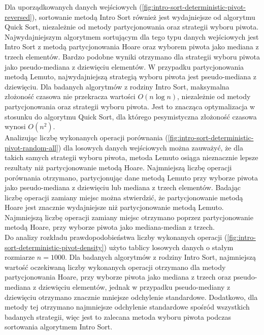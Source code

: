 Dla uporządkowanych danych wejściowych (\ref{fig:intro-sort-deterministic-pivot-reversed}), sortowanie metodą Intro Sort również jest wydajniejsze od algorytmu Quick Sort, niezależnie od metody partycjonowania oraz strategii wyboru piwota. Najwydajniejszym algorytmem sortującym dla tego typu danych wejściowych jest Intro Sort z metodą partycjonowania Hoare oraz wyborem piwota jako mediana z trzech elementów. Bardzo podobne wyniki otrzymano dla strategii wyboru piwota jako pseudo-mediana z dziewięciu elementów. W przypadku partycjonowania metodą Lemuto, najwydajniejszą strategią wyboru piwota jest pseudo-mediana z dziewięciu. Dla badanych algorytmów z rodziny Intro Sort, maksymalna złożoność czasowa nie przekracza wartości $O(n\log{n})$, niezależnie od metody partycjonowania oraz strategii wyboru piwota. Jest to znacząca optymalizacja w stosunku do algorytmu Quick Sort, dla którego pesymistyczna złożoność czasowa wynosi $O(n^2)$.\\

Analizując liczbę wykonanych operacji porównania (\ref{fig:intro-sort-deterministic-pivot-random-all}) dla losowych danych wejściowych można zauważyć, że dla takich samych strategii wyboru piwota, metoda Lemuto osiąga nieznacznie lepsze rezultaty niż partycjonowanie metodą Hoare. Najmniejszą liczbę operacji porównania otrzymano, partycjonując dane metodą Lemuto przy wyborze piwota jako pseudo-mediana z dziewięciu lub mediana z trzech elementów. Badając liczbę operacji zamiany miejsc można stwierdzić, że partycjonowanie metodą Hoare jest znacznie wydajniejsze niż partycjonowanie metodą Lemuto. Najmniejszą liczbę operacji zamiany miejsc otrzymano poprzez partycjonowanie metodą Hoare, przy wyborze piwota jako mediana-median z trzech.\\

Do analizy rozkładu prawdopodobieństwa liczby wykonanych operacji (\ref{fig:intro-sort-deterministic-pivot-density}) użyto tablicy losowych danych o stałym rozmiarze $n = 1000$. Dla badanych algorytmów z rodziny Intro Sort, najmniejszą wartość oczekiwaną liczby wykonanych operacji otrzymano dla metody partycjonowania Hoare, przy wyborze piwota jako mediana z trzech oraz pseudo-mediana z dziewięciu elementów, jednak w przypadku pseudo-mediany z dziewięciu otrzymano znacznie mniejsze odchylenie standardowe. Dodatkowo, dla metody tej otrzymano najmniejsze odchylenie standardowe spośród wszystkich badanych strategii, więc jest to zalecana metoda wyboru piwota podczas sortowania algorytmem Intro Sort.\\

